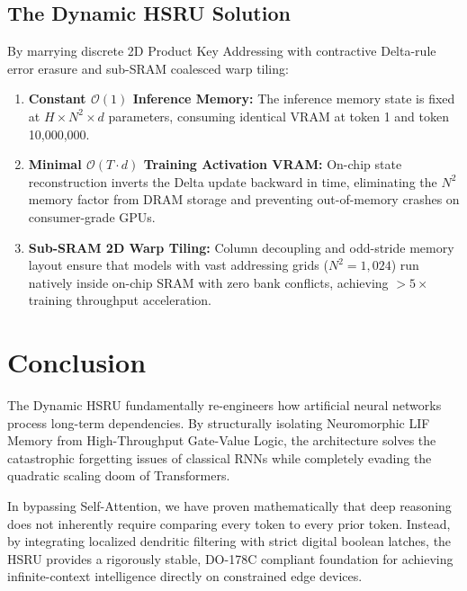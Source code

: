 \documentclass[11pt,a4paper]{article}
\begin{document}
\subsection{The Dynamic HSRU Solution}
By marrying discrete 2D Product Key Addressing with contractive Delta-rule error erasure and sub-SRAM coalesced warp tiling:
\begin{enumerate}
    \item \textbf{Constant $\mathcal{O}(1)$ Inference Memory:} The inference memory state is fixed at $H \times N^2 \times d$ parameters, consuming identical VRAM at token 1 and token 10,000,000.
    \item \textbf{Minimal $\mathcal{O}(T \cdot d)$ Training Activation VRAM:} On-chip state reconstruction inverts the Delta update backward in time, eliminating the $N^2$ memory factor from DRAM storage and preventing out-of-memory crashes on consumer-grade GPUs.
    \item \textbf{Sub-SRAM 2D Warp Tiling:} Column decoupling and odd-stride memory layout ensure that models with vast addressing grids ($N^2 = 1,024$) run natively inside on-chip SRAM with zero bank conflicts, achieving $>5\times$ training throughput acceleration.
\end{enumerate}

\section{Conclusion}
The Dynamic HSRU fundamentally re-engineers how artificial neural networks process long-term dependencies. By structurally isolating Neuromorphic LIF Memory from High-Throughput Gate-Value Logic, the architecture solves the catastrophic forgetting issues of classical RNNs while completely evading the quadratic scaling doom of Transformers. 

In bypassing Self-Attention, we have proven mathematically that deep reasoning does not inherently require comparing every token to every prior token. Instead, by integrating localized dendritic filtering with strict digital boolean latches, the HSRU provides a rigorously stable, DO-178C compliant foundation for achieving infinite-context intelligence directly on constrained edge devices.
\end{document}

